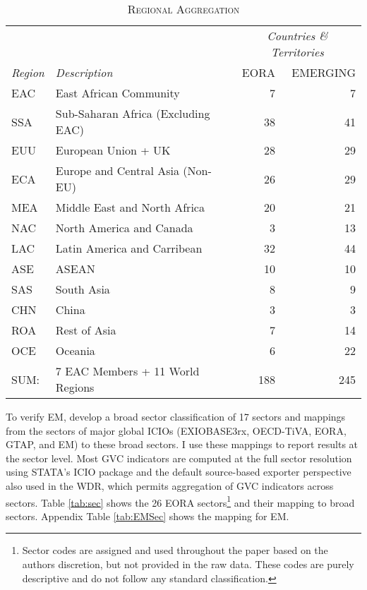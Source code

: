 \documentclass[a4paper]{article}
\begin{document}
\begin{table}[h!]
\centering
\caption{\label{tab:ctry}\textsc{Regional Aggregation}}
\vspace{2mm}
\begin{tabular}{llrr} \toprule
& & \multicolumn{2}{c}{\textit{Countries \& Territories}} \\
\textit{Region} & \textit{Description} & EORA & EMERGING \\ \midrule
EAC & East African Community & 7 & 7 \\
SSA & Sub-Saharan Africa (Excluding EAC) & 38 & 41 \\
EUU & European Union + UK & 28 & 29 \\
ECA & Europe and Central Asia (Non-EU) & 26 & 29 \\
MEA & Middle East and North Africa & 20 & 21\\
NAC & North America and Canada & 3 & 13 \\
LAC & Latin America and Carribean & 32 & 44 \\
ASE & ASEAN & 10 & 10 \\
SAS & South Asia & 8 & 9 \\
CHN & China & 3 & 3 \\
ROA & Rest of Asia & 7 & 14 \\
OCE & Oceania & 6 & 22 \\ \midrule
SUM: & 7 EAC Members + 11 World Regions & 188 & 245
 \\ \bottomrule
\end{tabular}
\end{table}
\FloatBarrier


To verify EM, \citep{huo2022full} develop a broad sector classification of 17 sectors and mappings from the sectors of major global ICIOs (EXIOBASE3rx, OECD-TiVA, EORA, GTAP, and EM) to these broad sectors. I use these mappings to report results at the sector level. Most GVC indicators are computed at the full sector resolution using STATA's ICIO package \citep{belotti2020icio} and the default source-based exporter perspective \citep{borin2019measuring} also used in the WDR, which permits aggregation of GVC indicators across sectors. Table \ref{tab:sec} shows the 26 EORA sectors\footnote{Sector codes are assigned and used throughout the paper based on the authors discretion, but not provided in the raw data. These codes are purely descriptive and do not follow any standard classification.} and their mapping to broad sectors. Appendix Table \ref{tab:EMSec} shows the mapping for EM. 
 
\end{document}
